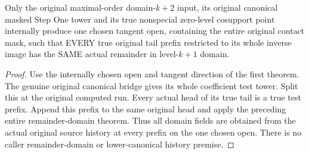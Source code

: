 \begin{theorem}
\label{hir:original-all-level-computed-contact-remainder-prefix-domain}
\leanok
{}
Only the original maximal-order domain-$k+2$ input, its original canonical
masked Step One tower and its true nonspecial zero-level cosupport point
internally produce one chosen tangent open, containing the entire original
contact mask, such that EVERY true original tail prefix restricted to its whole
inverse image has the SAME actual remainder in level-$k+1$ domain.
\end{theorem}
\begin{proof}
Use the internally chosen open and tangent direction of the first theorem.
The genuine original canonical bridge gives its whole coefficient test tower.
Split this at the original computed run. Every actual head of its true tail is
a true test prefix. Append this prefix to the same original head and apply the
preceding entire remainder-domain theorem. Thus all domain fields are obtained
from the actual original source history at every prefix on the one chosen open.
There is no caller remainder-domain or lower-canonical history premise.
\end{proof}

